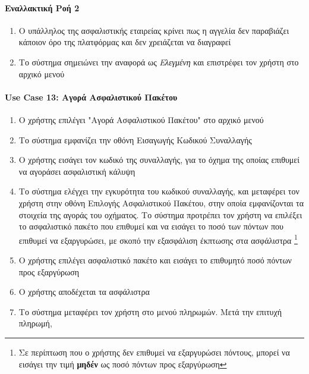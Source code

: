 \documentclass{../ol-softwaremanual}
\begin{document}
	\paragraph{Εναλλακτική Ροή 2}
	\begin{enumerate}
		\item Ο υπάλληλος της ασφαλιστικής εταιρείας κρίνει πως η αγγελία δεν παραβιάζει κάποιον όρο της πλατφόρμας και δεν χρειάζεται να διαγραφεί
		\item Το σύστημα σημειώνει την αναφορά ως \textit{Ελεγμένη}	και επιστρέφει τον χρήστη στο αρχικό μενού
	\end{enumerate}
	
	\paragraph{\en Use Case 13: \gr Αγορά Ασφαλιστικού Πακέτου}
	\begin{enumerate}
		\item Ο χρήστης επιλέγει \en"\gr Αγορά Ασφαλιστικού Πακέτου\en" \gr στο αρχικό μενού
		\item Το σύστημα εμφανίζει την οθόνη Εισαγωγής Κωδικού Συναλλαγής
		\item Ο χρήστης εισάγει τον κωδικό της συναλλαγής, για το όχημα της οποίας επιθυμεί να αγοράσει ασφαλιστική κάλυψη
		\item Το σύστημα ελέγχει την εγκυρότητα του κωδικού συναλλαγής, και μεταφέρει τον χρήστη στην οθόνη Επιλογής Ασφαλιστικού Πακέτου, στην οποία εμφανίζονται τα στοιχεία της αγοράς του οχήματος. Το σύστημα προτρέπει τον χρήστη να επιλέξει το ασφαλιστικό πακέτο που επιθυμεί και να εισάγει το ποσό των πόντων που επιθυμεί να εξαργυρώσει, με σκοπό την εξασφάλιση έκπτωσης στα ασφάλιστρα \footnote[3]{Σε περίπτωση που ο χρήστης δεν επιθυμεί να εξαργυρώσει πόντους, μπορεί να εισάγει την τιμή \textbf{μηδέν} ως ποσό πόντων προς εξαργύρωση}
		\item Ο χρήστης επιλέγει ασφαλιστικό πακέτο και εισάγει το επιθυμητό ποσό πόντων προς εξαργύρωση
		\item Ο χρήστης αποδέχεται τα ασφάλιστρα
		\item Το σύστημα μεταφέρει τον χρήστη στο μενού πληρωμών. Μετά την επιτυχή πληρωμή, 
	\end{enumerate}
	
\end{document}
